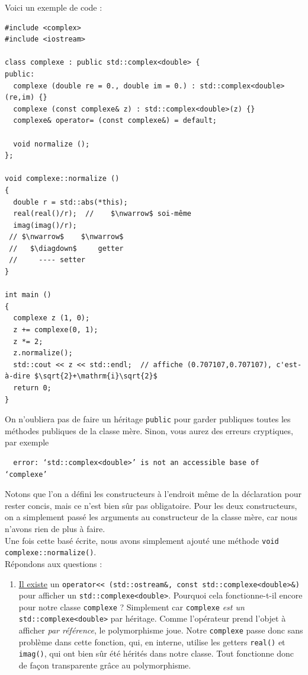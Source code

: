 \documentclass{book}
\newcommand{\inline}[1]{\texttt{#1}}
\begin{document}
\begin{correction}

Voici un exemple de code :

\begin{verbatim}
#include <complex>
#include <iostream>

class complexe : public std::complex<double> {
public:
  complexe (double re = 0., double im = 0.) : std::complex<double>(re,im) {}
  complexe (const complexe& z) : std::complex<double>(z) {}
  complexe& operator= (const complexe&) = default;

  void normalize ();
};

void complexe::normalize ()
{
  double r = std::abs(*this);
  real(real()/r);  //    $\nwarrow$ soi-même
  imag(imag()/r);
 // $\nwarrow$    $\nwarrow$
 //   $\diagdown$     getter
 //     ---- setter  
}

int main ()
{
  complexe z (1, 0);
  z += complexe(0, 1);
  z *= 2;
  z.normalize();
  std::cout << z << std::endl;  // affiche (0.707107,0.707107), c'est-à-dire $\sqrt{2}+\mathrm{i}\sqrt{2}$
  return 0;
}
\end{verbatim}

On n'oubliera pas de faire un héritage \inline{public} pour garder publiques toutes les méthodes publiques de la classe mère. Sinon, vous aurez des erreurs cryptiques, par exemple
\begin{verbatim}
  error: ‘std::complex<double>’ is not an accessible base of ‘complexe’
\end{verbatim}

Notons que l'on a défini les constructeurs à l'endroit même de la déclaration pour rester concis, mais ce n'est bien sûr pas obligatoire. Pour les deux constructeurs, on a simplement passé les arguments au constructeur de la classe mère, car nous n'avons rien de plus à faire.\\

Une fois cette basé écrite, nous avons simplement ajouté une méthode \inline{void complexe::normalize()}.\\

Répondons aux questions :
\begin{enumerate}

  \item \href{https://en.cppreference.com/w/cpp/numeric/complex/operator_ltltgtgt}{Il existe} un \inline{operator<< (std::ostream&, const std::complexe<double>&)} pour afficher un \inline{std::complexe<double>}. Pourquoi cela fonctionne-t-il encore pour notre classe \inline{complexe} ? Simplement car \inline{complexe} \emph{est un} \inline{std::complexe<double>} par héritage. Comme l'opérateur prend l'objet à afficher \emph{par référence}, le polymorphisme joue. Notre \inline{complexe} passe donc sans problème dans cette fonction, qui, en interne, utilise les getters \inline{real()} et \inline{imag()}, qui ont bien sûr été hérités dans notre classe. Tout fonctionne donc de façon transparente grâce au polymorphisme.


\end{enumerate}
\end{correction}
\end{document}
